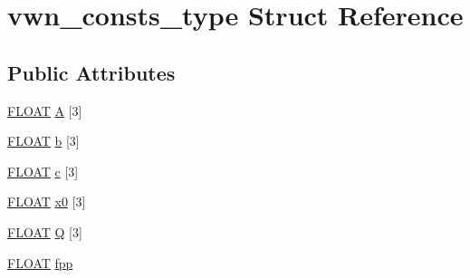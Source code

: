 \hypertarget{structvwn__consts__type}{\section{vwn\-\_\-consts\-\_\-type Struct Reference}
\label{structvwn__consts__type}
}
\subsection*{Public Attributes}
\begin{DoxyCompactItemize}
\item 
\hyperlink{src_2xc__config_8h_ae8690abbffa85934d64d545920e2b108}{F\-L\-O\-A\-T} \hyperlink{structvwn__consts__type_a0d4afdb240cf0e88adc10263484e669d}{A} \mbox{[}3\mbox{]}
\item 
\hyperlink{src_2xc__config_8h_ae8690abbffa85934d64d545920e2b108}{F\-L\-O\-A\-T} \hyperlink{structvwn__consts__type_a400c6e16583ca34d2ea7935a07ab760c}{b} \mbox{[}3\mbox{]}
\item 
\hyperlink{src_2xc__config_8h_ae8690abbffa85934d64d545920e2b108}{F\-L\-O\-A\-T} \hyperlink{structvwn__consts__type_aa47487414e28e21b4f6e93ef88ca9627}{c} \mbox{[}3\mbox{]}
\item 
\hyperlink{src_2xc__config_8h_ae8690abbffa85934d64d545920e2b108}{F\-L\-O\-A\-T} \hyperlink{structvwn__consts__type_ad40695b3de79919651cd59e9878120c9}{x0} \mbox{[}3\mbox{]}
\item 
\hyperlink{src_2xc__config_8h_ae8690abbffa85934d64d545920e2b108}{F\-L\-O\-A\-T} \hyperlink{structvwn__consts__type_acad32412ba3c30a193fddfe0ab81466a}{Q} \mbox{[}3\mbox{]}
\item 
\hyperlink{src_2xc__config_8h_ae8690abbffa85934d64d545920e2b108}{F\-L\-O\-A\-T} \hyperlink{structvwn__consts__type_afb58612321d6a9cba940af5776e59b0f}{fpp}
\end{DoxyCompactItemize}


